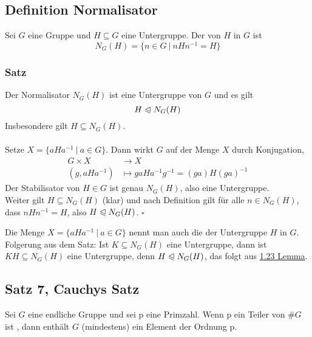 \subsection{Definition Normalisator}
\label{sub:def_normalisator}
Sei $G$ eine Gruppe und $H\subseteq G$ eine Untergruppe. 
Der  von $H$ in $G$ ist 
\[
N_G(H)=\{n\in G ~|~nHn^{-1}=H\} 
\]

\subsubsection*{Satz}
Der Normalisator $N_G(H)$ ist eine Untergruppe von $G$ und es gilt 
\[
H\trianglelefteqslant N_G(H) 
\] 
Insbesondere gilt $H\subseteq N_G(H)$.\\

\\
Setze $X=\{aHa^{-1}~|~a\in G \}$. Dann wirkt $G$ auf der Menge $X$ durch Konjugation,
\begin{equation*}
\begin{aligned}
	G\times X &\to X\\
	(g,aHa^{-1}) &\mapsto gaHa^{-1}g^{-1}=(ga)H(ga)^{-1}
\end{aligned}
\end{equation*}
Der Stabilisator von $H\in G$ ist genau $N_G(H)$, also eine Untergruppe.\\
Weiter gilt $H\subseteq N_G(H)$ (klar) und nach Definition gilt für alle $n\in N_G(H)$, dass $nHn^{-1}=H$, also $H\trianglelefteqslant N_G(H)$.
\hfill $\square$

Die Menge $X=\{aHa^{-1}~|~a\in G \}$ nennt man auch die  der Untergruppe $H$ in $G$.\\
Folgerung aus dem Satz: 
Ist $K\subseteq N_G(H)$ eine Untergruppe, dann ist $KH\subseteq N_G(H)$ eine Untergruppe, denn $H\trianglelefteqslant N_G(H)$, das folgt aus \hyperref[sub:isomorphiesaetze]{1.23 Lemma}.

\subsection{Satz 7, Cauchys Satz}
\label{sub:cauchys_satz}
Sei $G$ eine endliche Gruppe und sei p eine Primzahl. 
Wenn p ein Teiler von $\#G$ ist , dann enthält $G$ (mindestens) ein Element der Ordnung p.\\

